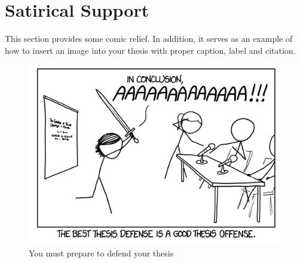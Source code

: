 \chapter{Satirical Support}

This section provides some comic relief. In addition, it serves as an example of how to insert an image into your thesis with proper caption, label and citation.

\begin{figure}[ht]
	\centering
	\includegraphics[width = 4.5in]{5_Appendices/Appendix_B/Figures/Thesis_Defence.png}
	\caption{You must prepare to defend your thesis \cite{xkcdThesis}} 
	\label{fig:DEFENCE}
\end{figure}

\clearpage